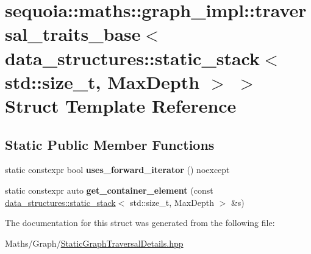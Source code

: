 \hypertarget{structsequoia_1_1maths_1_1graph__impl_1_1traversal__traits__base_3_01data__structures_1_1static_1b880207242fc6b76d48dde2eb1675a9}{}\section{sequoia\+::maths\+::graph\+\_\+impl\+::traversal\+\_\+traits\+\_\+base$<$ data\+\_\+structures\+::static\+\_\+stack$<$ std\+::size\+\_\+t, Max\+Depth $>$ $>$ Struct Template Reference}
\label{structsequoia_1_1maths_1_1graph__impl_1_1traversal__traits__base_3_01data__structures_1_1static_1b880207242fc6b76d48dde2eb1675a9}
\subsection*{Static Public Member Functions}
\begin{DoxyCompactItemize}
\item 
\mbox{\label{structsequoia_1_1maths_1_1graph__impl_1_1traversal__traits__base_3_01data__structures_1_1static_1b880207242fc6b76d48dde2eb1675a9_a6da748d5e6b4f4a10512ebc27235e45b}} 
static constexpr bool {\bfseries uses\+\_\+forward\+\_\+iterator} () noexcept
\item 
\mbox{\label{structsequoia_1_1maths_1_1graph__impl_1_1traversal__traits__base_3_01data__structures_1_1static_1b880207242fc6b76d48dde2eb1675a9_aca97e256d9cd37f15448af851c069d90}} 
static constexpr auto {\bfseries get\+\_\+container\+\_\+element} (const \mbox{\hyperlink{classsequoia_1_1data__structures_1_1static__stack}{data\+\_\+structures\+::static\+\_\+stack}}$<$ std\+::size\+\_\+t, Max\+Depth $>$ \&s)
\end{DoxyCompactItemize}


The documentation for this struct was generated from the following file\+:\begin{DoxyCompactItemize}
\item 
Maths/\+Graph/\mbox{\hyperlink{_static_graph_traversal_details_8hpp}{Static\+Graph\+Traversal\+Details.\+hpp}}\end{DoxyCompactItemize}
